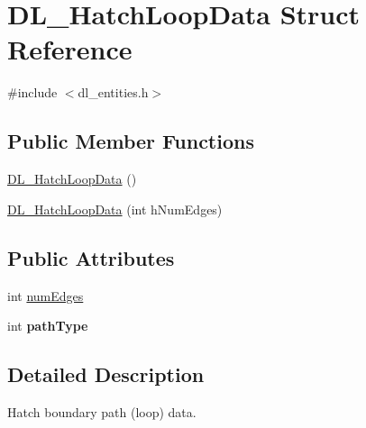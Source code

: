 \hypertarget{structDL__HatchLoopData}{\section{D\-L\-\_\-\-Hatch\-Loop\-Data Struct Reference}
\label{structDL__HatchLoopData}
}


{\ttfamily \#include $<$dl\-\_\-entities.\-h$>$}

\subsection*{Public Member Functions}
\begin{DoxyCompactItemize}
\item 
\hyperlink{structDL__HatchLoopData_af07f6679c5a06de598a8a10dd757ff5d}{D\-L\-\_\-\-Hatch\-Loop\-Data} ()
\item 
\hyperlink{structDL__HatchLoopData_a39c5004888a4f81d21446f6f5a491400}{D\-L\-\_\-\-Hatch\-Loop\-Data} (int h\-Num\-Edges)
\end{DoxyCompactItemize}
\subsection*{Public Attributes}
\begin{DoxyCompactItemize}
\item 
int \hyperlink{structDL__HatchLoopData_abe48938d331f2a76c755e144b5644d41}{num\-Edges}
\item 
\hypertarget{structDL__HatchLoopData_a8a8e224136b0590e8a8c191be8c3affe}{int {\bfseries path\-Type}}\label{structDL__HatchLoopData_a8a8e224136b0590e8a8c191be8c3affe}

\end{DoxyCompactItemize}


\subsection{Detailed Description}
Hatch boundary path (loop) data. 

